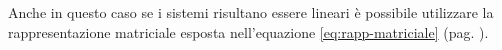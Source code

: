 		Anche in questo caso se i sistemi risultano essere lineari è possibile utilizzare la rappresentazione matriciale esposta nell'equazione \ref{eq:rapp-matriciale} (pag. \pageref{eq:rapp-matriciale}).
	
	
	
	
	
